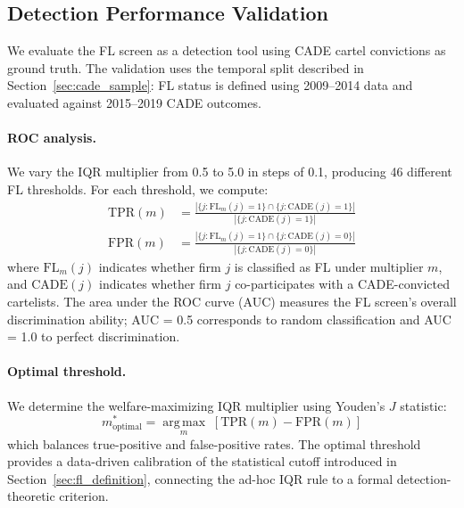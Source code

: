 
\subsection{Detection Performance Validation}
\label{sec:detection_validation}

We evaluate the FL screen as a detection tool using CADE cartel
convictions as ground truth. The validation uses the temporal split
described in Section~\ref{sec:cade_sample}: FL status is defined using
2009--2014 data and evaluated against 2015--2019 CADE outcomes.

\paragraph{ROC analysis.}
We vary the IQR multiplier from 0.5 to 5.0 in steps of 0.1, producing
46 different FL thresholds. For each threshold, we compute:
\begin{align}
  \text{TPR}(m) &= \frac{|\{j : \text{FL}_m(j)=1\} \cap
    \{j : \text{CADE}(j)=1\}|}{|\{j : \text{CADE}(j)=1\}|}
  \label{eq:tpr} \\
  \text{FPR}(m) &= \frac{|\{j : \text{FL}_m(j)=1\} \cap
    \{j : \text{CADE}(j)=0\}|}{|\{j : \text{CADE}(j)=0\}|}
  \label{eq:fpr}
\end{align}
where $\text{FL}_m(j)$ indicates whether firm $j$ is classified as FL
under multiplier $m$, and $\text{CADE}(j)$ indicates whether firm $j$
co-participates with a CADE-convicted cartelists. The area under the ROC
curve (AUC) measures the FL screen's overall discrimination ability; AUC
= 0.5 corresponds to random classification and AUC = 1.0 to perfect
discrimination.

\paragraph{Optimal threshold.}
We determine the welfare-maximizing IQR multiplier using Youden's $J$
statistic:
\begin{equation}
  m^*_{\text{optimal}} = \operatorname*{arg\,max}_m \;
  \left[\text{TPR}(m) - \text{FPR}(m)\right]
  \label{eq:youden}
\end{equation}
which balances true-positive and false-positive rates. The optimal
threshold provides a data-driven calibration of the statistical cutoff
introduced in Section~\ref{sec:fl_definition}, connecting the ad-hoc
IQR rule to a formal detection-theoretic criterion.

